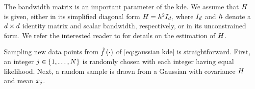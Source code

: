The bandwidth matrix is an important parameter of the \ac{kde}. 
We assume that $H$ is given, either in its simplified diagonal form $H=h^2 I_{d}$, where $I_{d}$ and $h$ denote a $d\times d$ identity matrix and scalar bandwidth, respectively, or in its unconstrained form.
We refer the interested reader to \autocite{turlach1993bandwidthselection, jones1996brief, duong2007ks, gramacki2017fft} for details on the estimation of $H$.

Sampling new data points from $\hat{f}\left( \cdot \right)$ of \cref{eq:gaussian kde} is straightforward.
First, an integer $j\in\{1,\ldots,N\}$ is randomly chosen with each integer having equal likelihood. 
Next, a random \cstarta sample is drawn from a Gaussian with covariance $H$ and mean $x_{j}$. \cenda

